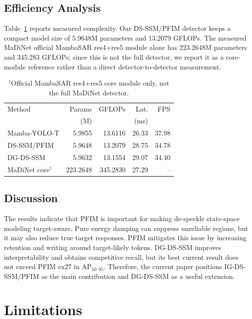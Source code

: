 \documentclass[letterpaper]{article}
\begin{document}
\subsection{Efficiency Analysis}

Table~\ref{tab:complexity} reports measured complexity. Our DS-SSM/PFIM detector keeps a compact model size of 5.9648M parameters and 13.2079 GFLOPs. The measured MaDiNet official MambaSAR res4+res5 module alone has 223.2648M parameters and 345.283 GFLOPs; since this is not the full detector, we report it as a core-module reference rather than a direct detector-to-detector measurement.

\begin{table}[t]
\centering
\caption{Measured complexity at 640 input resolution, batch size 1, fp32, on RTX 3090.}
\label{tab:complexity}
\begin{tabular}{lrrrr}
\toprule
Method & Params & GFLOPs & Lat. & FPS \\
 & (M) & & (ms) & \\
\midrule
Mamba-YOLO-T & 5.9855 & 13.6116 & 26.33 & 37.98 \\
DS-SSM/PFIM & 5.9648 & 13.2079 & 28.75 & 34.78 \\
DG-DS-SSM & 5.9632 & 13.1554 & 29.07 & 34.40 \\
MaDiNet core$^\dagger$ & 223.2648 & 345.2830 & 27.29 & -- \\
\bottomrule
\end{tabular}
\vspace{2pt}
\caption*{\footnotesize $^\dagger$Official MambaSAR res4+res5 core module only, not the full MaDiNet detector.}
\end{table}

\subsection{Discussion}

The results indicate that PFIM is important for making de-speckle state-space modeling target-aware. Pure energy damping can suppress unreliable regions, but it may also reduce true target responses. PFIM mitigates this issue by increasing retention and writing around target-likely tokens. DG-DS-SSM improves interpretability and obtains competitive recall, but its best current result does not exceed PFIM ex27 in AP$_{50:95}$. Therefore, the current paper positions IG-DS-SSM/PFIM as the main contribution and DG-DS-SSM as a useful extension.

\section{Limitations}
\end{document}

